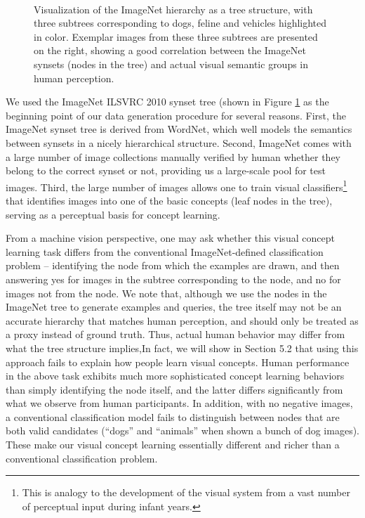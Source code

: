 \begin{figure}
\begin{minipage}{0.45\linewidth}
\begin{flushleft}
        \introsep
        \introsep
        \introsep
        \\
        \introsep
        \introsep
        \introsep
        \end{flushleft}
    \end{minipage}
    \caption{Visualization of the ImageNet hierarchy as a tree structure, with three subtrees corresponding to dogs, feline and vehicles highlighted in color. Exemplar images from these three subtrees are presented on the right, showing a good correlation between the ImageNet synsets (nodes in the tree) and actual visual semantic groups in human perception.}\label{fig:ilsvrc2010tree}
\end{figure}

We used the ImageNet ILSVRC 2010 synset tree (shown in Figure \ref{fig:ilsvrc2010tree} as the beginning point of our data generation procedure for several reasons. First, the ImageNet synset tree is derived from WordNet, which well models the semantics between synsets in a nicely hierarchical structure. Second, ImageNet comes with a large number of image collections manually verified by human whether they belong to the correct synset or not, providing us a large-scale pool for test images. Third, the large number of images allows one to train visual classifiers\footnote{This is analogy to the development of the visual system from a vast number of perceptual input during infant years.} that identifies images into one of the basic concepts (leaf nodes in the tree), serving as a perceptual basis for concept learning.

From a machine vision perspective, one may ask whether this visual concept learning task differs from the conventional ImageNet-defined classification problem -- identifying the node from which the examples are drawn, and then answering yes for images in the subtree corresponding to the node, and no for images not from the node. We note that, although we use the nodes in the ImageNet tree to generate examples and queries, the tree itself may not be an accurate hierarchy that matches human perception, and should only be treated as a proxy instead of ground truth. Thus, actual human behavior may differ from what the tree structure implies,In fact, we will show in Section 5.2 that using this approach fails to explain how people learn visual concepts. Human performance in the above task exhibits much more sophisticated concept learning behaviors than simply identifying the node itself, and the latter differs significantly from what we observe from human participants. In addition, with no negative images, a conventional classification model fails to distinguish between nodes that are both valid candidates (\eg ``dogs'' and ``animals'' when shown a bunch of dog images). These make our visual concept learning essentially different and richer than a conventional classification problem.

